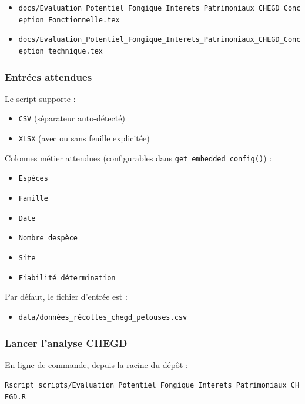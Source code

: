 \begin{itemize}
\tightlist
\item
  \texttt{docs/Evaluation\_Potentiel\_Fongique\_Interets\_Patrimoniaux\_CHEGD\_Conception\_Fonctionnelle.tex}
\item
  \texttt{docs/Evaluation\_Potentiel\_Fongique\_Interets\_Patrimoniaux\_CHEGD\_Conception\_technique.tex}
\end{itemize}

\subsubsection{Entrées attendues}\label{entruxe9es-attendues}

Le script supporte :

\begin{itemize}
\tightlist
\item
  \texttt{CSV} (séparateur auto-détecté)
\item
  \texttt{XLSX} (avec ou sans feuille explicitée)
\end{itemize}

Colonnes métier attendues (configurables dans
\texttt{get\_embedded\_config()}) :

\begin{itemize}
\tightlist
\item
  \texttt{Espèces}
\item
  \texttt{Famille}
\item
  \texttt{Date}
\item
  \texttt{Nombre\ d\textquotesingle{}espèce}
\item
  \texttt{Site}
\item
  \texttt{Fiabilité\ détermination}
\end{itemize}

Par défaut, le fichier d'entrée est :

\begin{itemize}
\tightlist
\item
  \texttt{data/données\_récoltes\_chegd\_pelouses.csv}
\end{itemize}

\subsubsection{Lancer l'analyse CHEGD}\label{lancer-lanalyse-chegd}

En ligne de commande, depuis la racine du dépôt :

\texttt{Rscript\ scripts/Evaluation\_Potentiel\_Fongique\_Interets\_Patrimoniaux\_CHEGD.R}

